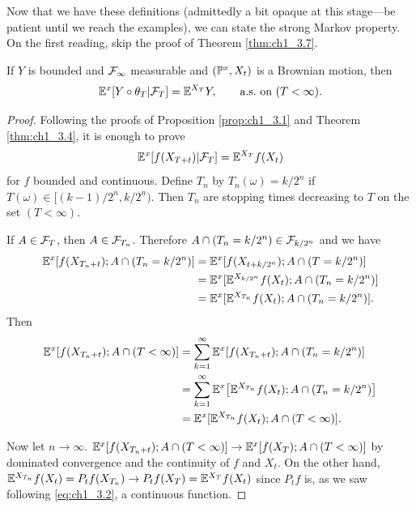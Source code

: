 Now that we have these definitions (admittedly a bit opaque at this stage---be patient until we reach the examples), we can state the strong Markov property. On the first reading, skip the proof of Theorem \ref{thm:ch1_3.7}.

\begin{theorem}\label{thm:ch1_3.7}
If $Y$ is bounded and $\FC_\infty$ measurable and $(\P^x, X_t)$ is a Brownian motion, then
\[
    \E^x[Y \circ \theta_T\mid \FC_T] = \E^{X_T}Y, \qquad \textnormal{a.s.}~\text{on}~(T < \infty).
\]
\end{theorem}

\begin{proof}
Following the proofs of Proposition \ref{prop:ch1_3.1} and Theorem \ref{thm:ch1_3.4}, it is enough to prove
\[
    \E^x[f(X_{T+t})\mid \FC_T] = \E^{X_T}f(X_t)
\]
for $f$ bounded and continuous. Define $T_n$ by $T_n(\omega) = k/2^n$ if $T(\omega) \in [(k-1)/2^n,k/2^n)$. Then $T_n$ are stopping times decreasing to $T$ on the set $(T < \infty)$.

If $A \in \FC_T$, then $A\in\FC_{T_n}$. Therefore $A \cap (T_n = k/2^n) \in \FC_{k/2^n}$ and we have
\begin{align*}
    \E^x[f(X_{T_n+t});A \cap (T_n = k/2^n)] &= \E^x[f(X_{t+k/2^n});A \cap (T = k/2^n)] \\
    &= \E^x[\E^{X_{k/2^n}}f(X_t);A \cap (T_n = k/2^n)] \\
    &= \E^x[\E^{X_{T_n}}f(X_t);A \cap (T_n = k/2^n)].
\end{align*}
Then
\begin{align*}
    \E^x[f(X_{T_n+t});A \cap (T < \infty)] &= \sum_{k=1}^\infty \E^x[f(X_{T_n+t});A \cap (T_n = k/2^n)] \\
    &= \sum_{k=1}^\infty \E^x\big[\E^{X_{T_n}}f(X_t);A \cap (T_n = k/2^n)\big] \\
    &= \E^x[\E^{X_{T_n}}f(X_t);A \cap (T < \infty)].
\end{align*}

\mpagebreak

Now let $n \to \infty$. $\E^x[f(X_{T_n+t});A \cap (T < \infty)] \to \E^x[f(X_T);A \cap (T < \infty)]$ by dominated convergence and the continuity of $f$ and $X_t$. On the other hand, $\E^{X_{T_n}}f(X_t) = P_tf(X_{T_n}) \to P_tf(X_T) = \E^{X_T}f(X_t)$ since $P_tf$ is, as we saw following \eqref{eq:ch1_3.2}, a continuous function.
\end{proof}

